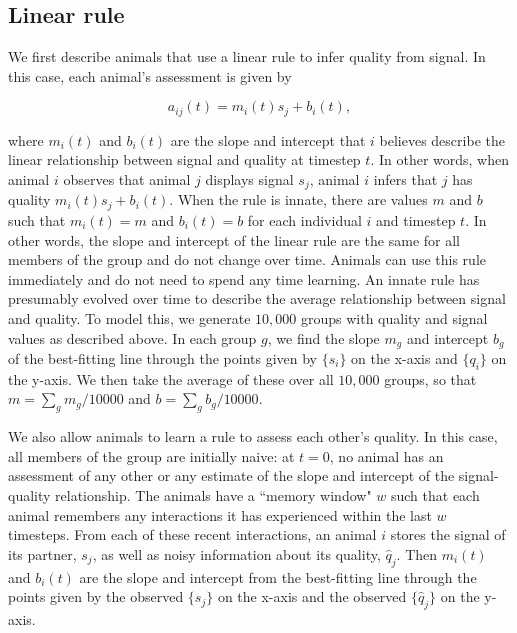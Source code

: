 \subsection*{Linear rule}
We first describe animals that use a linear rule to infer quality from signal. In this case, each animal's assessment is given by
\begin{linenomath*}
\begin{equation*}
a_{ij}(t)=m_i(t)s_j+b_i(t),
\end{equation*}
\end{linenomath*}
where $m_i(t)$ and $b_i(t)$ are the slope and intercept that $i$ believes describe the linear relationship between signal and quality at timestep $t$. In other words, when animal $i$ observes that animal $j$ displays signal $s_j$, animal $i$ infers that $j$ has quality $m_i(t)s_j+b_i(t)$. When the rule is innate, there are values $m$ and $b$ such that $m_i(t)=m$ and $b_i(t)=b$ for each individual $i$ and timestep $t$. In other words, the slope and intercept of the linear rule are the same for all members of the group and do not change over time. Animals can use this rule immediately and do not need to spend any time learning.  An innate rule has presumably evolved over time to describe the average relationship between signal and quality. To model this, we generate $10,000$ groups with quality and signal values as described above. In each group $g$, we find the slope $m_{g}$ and intercept $b_{g}$ of the best-fitting line through the points given by $\{s_i\}$ on the x-axis and $\{q_i\}$ on the y-axis. We then take the average of these over all $10,000$ groups, so that $m=\sum_{g} m_{g}/10000$ and $b=\sum_{g}b_{g}/10000$. 

We also allow animals to learn a rule to assess each other's quality. In this case, all members of the group are initially naive: at $t=0$, no animal has an assessment of any other or any estimate of the slope and intercept of the signal-quality relationship. The animals have a ``memory window" $w$ such that each animal remembers any interactions it has experienced within the last $w$ timesteps. From each of these recent interactions, an animal $i$ stores the signal of its partner, $s_j$, as well as noisy information about its quality, $\hat{q}_j$.  Then $m_i(t)$ and $b_i(t)$ are the slope and intercept from the best-fitting line through the points given by the observed $\{s_j\}$ on the x-axis and the observed $\{\hat{q}_j\}$ on the y-axis.   

